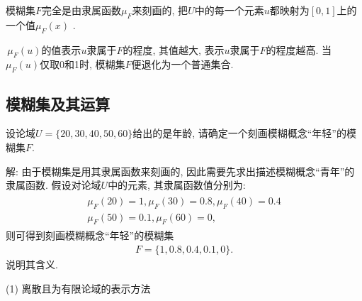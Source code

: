 \begin{remark}
 模糊集$F$完全是由隶属函数$\mu_{F}$来刻画的, 把$U$中的每一个元素$u$都映射为$[0, 1]$上的一个值$\mu_F(x)$ .

 \,$\mu_F(u)$的值表示$u$隶属于$F$的程度, 其值越大, 表示$u$隶属于$F$的程度越高. 当$\mu_F(u)$仅取0和1时, 模糊集$F$便退化为一个普通集合.
\end{remark}
\subsection{模糊集及其运算}
\begin{example}\label{AIC5Fuzzyexam551}
    设论域$U=\{20, 30, 40, 50, 60\}$给出的是年龄, 请确定一个刻画模糊概念“年轻”的模糊集$F$.
\end{example}

解: 由于模糊集是用其隶属函数来刻画的, 因此需要先求出描述模糊概念“青年”的隶属函数. 假设对论域$U$中的元素, 其隶属函数值分别为:
\begin{align}
    \begin{array}{l}
        {\mu_{F}(20)=1, \mu_{F}(30)=0.8, \mu_{F}(40)=0.4} \\ {\mu_{F}(50)=0.1, \mu_{F}(60)=0},
    \end{array}
\end{align}
则可得到刻画模糊概念“年轻”的模糊集
\begin{align}
    F=\{ 1, 0.8, 0.4, 0.1, 0\}.
\end{align}
说明其含义.

(1) 离散且为有限论域的表示方法

